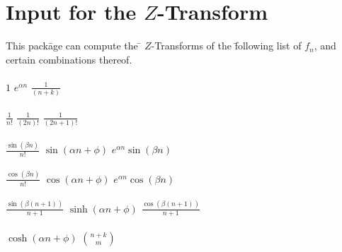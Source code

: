 \section{Input for the $Z$-Transform}
\begin{tabbing}
  This pack\=age can compute the \= $Z$-Transforms of the \=following
  list of $f_n$, and \\ certain combinations thereof.\\ \\

\>$1$
\>$e^{\alpha n}$
\>$\frac{1}{(n+k)}$               \\ \\
\>$\frac{1}{n!}$
\>$\frac{1}{(2n)!}$
\>$\frac{1}{(2n+1)!}$             \\ \\
\>$\frac{\sin(\beta n)}{n!}$
\>$\sin(\alpha n+\phi)$
\>$e^{\alpha n} \sin(\beta n)$    \\ \\
\>$\frac{\cos(\beta n)}{n!}$
\>$\cos(\alpha n+\phi)$
\>$e^{\alpha n} \cos(\beta n)$    \\ \\
\>$\frac{\sin(\beta (n+1))}{n+1}$
\>$\sinh(\alpha n+\phi)$
\>$\frac{\cos(\beta (n+1))}{n+1}$ \\ \\
\>$\cosh(\alpha n+\phi)$
\>${n+k \choose m}$\\
\end{tabbing}

